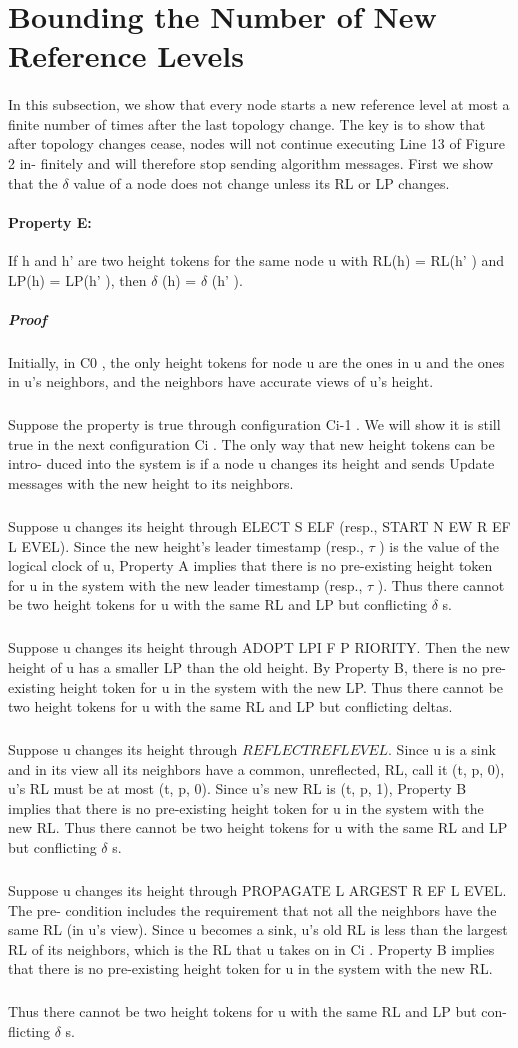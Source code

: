 \section{Bounding the Number of New Reference Levels}
\paragraph{}In this subsection, we show that every node starts a new reference level at most a finite number of times after the last topology change. The key is to show that after topology changes cease, nodes will not continue executing Line 13 of Figure 2 in- finitely and will therefore stop sending algorithm messages. First we show that the $\delta$ value of a node does not change unless its RL or LP changes.
\paragraph{Property E:}If h and h' are two height tokens for the same node u with RL(h) = RL(h' ) and LP(h) = LP(h' ), then $\delta$ (h) = $\delta$ (h' ).
\subparagraph{Proof}Initially, in C0 , the only height tokens for node u are the ones in u and the ones in u's neighbors, and the neighbors have accurate views of u's height.
\subparagraph{}Suppose the property is true through configuration Ci-1 . We will show it is still true in the next configuration Ci . The only way that new height tokens can be intro- duced into the system is if a node u changes its height and sends Update messages with the new height to its neighbors.
\subparagraph{}Suppose u changes its height through ELECT S ELF (resp., START N EW R EF L EVEL). Since the new height's leader timestamp (resp., $\tau$ ) is the value of the logical clock of u, Property A implies that there is no pre-existing height token for u in the system with the new leader timestamp (resp., $\tau$ ). Thus there cannot be two height tokens for u with the same RL and LP but conflicting $\delta$ s.
\subparagraph{}Suppose u changes its height through ADOPT LPI F P RIORITY. Then the new height of u has a smaller LP than the old height. By Property B, there is no pre-existing height token for u in the system with the new LP. Thus there cannot be two height tokens for u with the same RL and LP but conflicting deltas.
\subparagraph{}Suppose u changes its height through $REFLECTREFLEVEL$. Since u is a sink and in its view all its neighbors have a common, unreflected, RL, call it (t, p, 0), u's RL must be at most (t, p, 0). Since u's new RL is (t, p, 1), Property B implies that there is no pre-existing height token for u in the system with the new RL. Thus there cannot be two height tokens for u with the same RL and LP but conflicting $\delta$ s. 
\subparagraph{}Suppose u changes its height through PROPAGATE L ARGEST R EF L EVEL. The pre- condition includes the requirement that not all the neighbors have the same RL (in u's view). Since u becomes a sink, u's old RL is less than the largest RL of its neighbors, which is the RL that u takes on in Ci . Property B implies that there is no pre-existing height token for u in the system with the new RL. 
\subparagraph{}Thus there cannot be two height tokens for u with the same RL and LP but con- flicting $\delta$ s.

